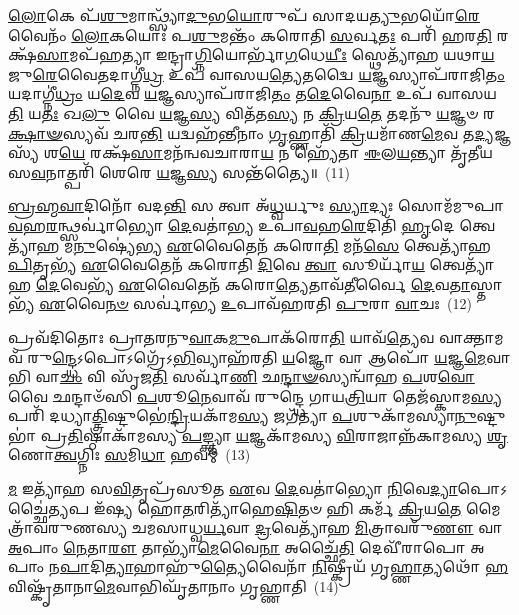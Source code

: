 \-\ul{𑌲𑍋}\-𑌕𑍇 𑌪᳴\-\ul{𑌶𑍁}\-𑌮𑌾𑌨𑍍𑌥𑍍𑌸𑍍𑌯𑌾᳴\-\ul{𑌦𑍁}\-𑌭\-\ul{𑌯𑍋}\-𑌰𑍁𑌪᳴ 𑌸𑌾𑌦𑌯\-\ul{𑌤𑍍𑌯𑍁}\-𑌭𑌯𑍋᳴\-\ul{𑌰𑍇}\-𑌵𑍈𑌨𑌂᳴ \ul{𑌲𑍋}\-𑌕𑌯𑍋𑌃॑ 𑌪\-\ul{𑌶𑍁}\-𑌮𑌨𑍍𑌤𑌂᳴ 𑌕𑌰𑍋𑌤𑌿 \ul{𑌸}\-𑌰𑍍𑌵\-\ul{𑌤𑌃} 𑌪𑌰𑌿᳴ 𑌹𑌰\-\ul{𑌤𑌿} 𑌰𑌕𑍍𑌷᳴\-\ul{𑌸𑌾}\-𑌮𑌪᳴𑌹𑌤𑍍𑌯𑌾 𑌇𑌨𑍍𑌦𑍍𑌰𑌾\-\ul{𑌗𑍍𑌨𑌿}\-𑌯𑍋𑌰𑍍𑌭𑌾᳴\-\ul{𑌗}\-𑌧𑍇\-\ul{𑌯𑍀𑌃} 𑌸𑍍𑌥𑍇𑌤𑍍𑌯𑌾᳴𑌹 𑌯𑌥𑌾\-\ul{𑌯}\-𑌜𑍁\-\ul{𑌰𑍇}\-𑌵𑍈𑌤𑌦𑌾𑌗𑍍𑌨𑍀॑\-\ul{𑌧𑍍𑌰} 𑌉𑌪᳴ 𑌵𑌾𑌸𑌯\-\ul{𑌤𑍍𑌯𑍇}\-𑌤𑌦𑍍𑌵𑍈 \ul{𑌯}\-𑌜𑍍𑌞𑌸𑍍𑌯𑌾𑌪᳴𑌰𑌾𑌜𑌿\-\ul{𑌤𑌂} 𑌯𑌦𑌾𑌗𑍍𑌨𑍀॑\-\ul{𑌧𑍍𑌰𑌂} 𑌯\-\ul{𑌦𑍇}\-𑌵 \ul{𑌯}\-𑌜𑍍𑌞𑌸𑍍𑌯𑌾𑌪᳴𑌰𑌾𑌜𑌿\-\ul{𑌤𑌂} 𑌤\-\ul{𑌦𑍇}\-𑌵𑍈\-\ul{𑌨𑌾} 𑌉𑌪᳴ 𑌵𑌾𑌸𑌯\-\ul{𑌤𑌿} 𑌯\-\ul{𑌤𑌃} 𑌖\-\ul{𑌲𑍁} 𑌵𑍈 \ul{𑌯}\-𑌜𑍍𑌞\-\ul{𑌸𑍍𑌯} 𑌵𑌿𑌤᳴𑌤\-\ul{𑌸𑍍𑌯} 𑌨 \ul{𑌕𑍍𑌰𑌿}\-𑌯\-\ul{𑌤𑍇} 𑌤𑌦𑌨𑍁᳴ \ul{𑌯}\-𑌜𑍍𑌞𑍞 𑌰\-\ul{𑌕𑍍𑌷𑌾}\-\-\ul{𑍟}\-𑌸𑍍𑌯𑌵᳴ 𑌚𑌰\-\ul{𑌨𑍍𑌤𑌿} 𑌯𑌦𑍍𑌵𑌹᳴𑌨𑍍𑌤𑍀𑌨𑌾𑌂 \ul{𑌗𑍃}\-𑌹𑍍𑌣𑌾𑌤𑌿᳴ \ul{𑌕𑍍𑌰𑌿}\-𑌯𑌮𑌾᳴𑌣\-\ul{𑌮𑍇}\-𑌵 𑌤\-\ul{𑌦𑍍𑌯}\-𑌜𑍍𑌞𑌸𑍍𑌯᳴ 𑌶\-\ul{𑌯𑍇} 𑌰𑌕𑍍𑌷᳴\-\ul{𑌸𑌾}\-𑌮𑌨᳴𑌨𑍍𑌵𑌵𑌚𑌾𑌰𑌾\-\ul{𑌯} 𑌨 𑌹𑍍𑌯𑍇᳴𑌤𑌾 \ul{𑌈}\-𑌲\-\ul{𑌯}\-𑌨𑍍𑌤𑍍𑌯𑌾 𑌤𑍃᳴𑌤𑍀𑌯𑌸\-\ul{𑌵}\-𑌨𑌾𑌤𑍍𑌪𑌰𑌿᳴ 𑌶𑍇𑌰𑍇 \ul{𑌯}\-𑌜𑍍𑌞\-\ul{𑌸𑍍𑌯} 𑌸𑌨𑍍𑌤᳴𑌤𑍍𑌯𑍈॥~(11)

{\anuvakamend[{\-\ul{𑌸𑍍𑌯𑌾}\-𑌦𑌿𑌨𑍍𑌦𑍍𑌰𑍋᳴ 𑌗𑍃\-\ul{𑌹𑍍𑌣𑍀}\-𑌯𑌾𑌦᳴\-\ul{𑌸𑍍𑌤𑍍𑌵}\-𑌮𑍁𑌷𑍍𑌮𑌿᳴\-\ul{𑌨𑍍𑌕𑍍𑌰𑌿}\-𑌯\-\ul{𑌤𑍇} 𑌷𑌡𑍍𑌵𑌿𑍞᳴𑌶𑌤𑌿𑌶𑍍𑌚}]}%

\-\ul{𑌬𑍍𑌰}\-\-\ul{𑌹𑍍𑌮}\-\-\ul{𑌵𑌾}\-𑌦𑌿𑌨𑍋᳴ 𑌵𑌦\-\ul{𑌨𑍍𑌤𑌿} 𑌸 𑌤𑍍𑌵𑌾 𑌅᳴\-\ul{𑌧𑍍𑌵}\-𑌰𑍍𑌯𑍁𑌃 \ul{𑌸𑍍𑌯𑌾}\-𑌦𑍍𑌯𑌃 𑌸𑍋𑌮᳴𑌮𑍁𑌪𑌾\-\ul{𑌵}\-𑌹\-\ul{𑌰}\-𑌨𑍍𑌥𑍍𑌸𑌰𑍍𑌵𑌾॑𑌭𑍍𑌯𑍋 \ul{𑌦𑍇}\-𑌵𑌤𑌾॑𑌭𑍍𑌯 𑌉𑌪𑌾\-\ul{𑌵}\-𑌹\-\ul{𑌰𑍇}\-𑌦𑌿𑌤𑌿᳴ \ul{𑌹𑍃}\-𑌦𑍇 𑌤𑍍𑌵𑍇𑌤𑍍𑌯𑌾᳴𑌹 𑌮\-\ul{𑌨𑍁}\-𑌷𑍍𑌯𑍇॑𑌭𑍍𑌯 \ul{𑌏}\-𑌵𑍈𑌤𑍇𑌨᳴ 𑌕𑌰𑍋\-\ul{𑌤𑌿} 𑌮𑌨᳴\-\ul{𑌸𑍇} 𑌤𑍍𑌵𑍇𑌤𑍍𑌯𑌾᳴𑌹 \ul{𑌪𑌿}\-𑌤𑍃𑌭𑍍𑌯᳴ \ul{𑌏}\-𑌵𑍈𑌤𑍇𑌨᳴ 𑌕𑌰𑍋𑌤𑌿 \ul{𑌦𑌿}\-𑌵𑍇 \ul{𑌤𑍍𑌵𑌾} 𑌸𑍂𑌰𑍍𑌯𑌾᳴\-\ul{𑌯} 𑌤𑍍𑌵𑍇𑌤𑍍𑌯𑌾᳴𑌹 \ul{𑌦𑍇}\-𑌵𑍇𑌭𑍍𑌯᳴ \ul{𑌏}\-𑌵𑍈𑌤𑍇𑌨᳴ 𑌕𑌰𑍋\-\ul{𑌤𑍍𑌯𑍇}\-𑌤𑌾𑌵᳴\-\ul{𑌤𑍀}\-𑌰𑍍𑌵𑍈 \ul{𑌦𑍇}\-𑌵\-\ul{𑌤𑌾}\-𑌸𑍍𑌤𑌾𑌭𑍍𑌯᳴ \ul{𑌏}\-𑌵𑍈\-\ul{𑌨}\-\-\ul{𑍞} 𑌸𑌰𑍍𑌵𑌾॑𑌭𑍍𑌯 \ul{𑌉}\-𑌪𑌾𑌵᳴𑌹𑌰𑌤𑌿 \ul{𑌪𑍁}\-𑌰𑌾 \ul{𑌵𑌾}\-𑌚𑌃~(12)

𑌪𑍍𑌰𑌵᳴𑌦𑌿𑌤𑍋𑌃 𑌪𑍍𑌰𑌾𑌤𑌰𑌨𑍁\-\ul{𑌵𑌾}\-𑌕\-\ul{𑌮𑍁}\-𑌪𑌾𑌕᳴𑌰𑍋\-\ul{𑌤𑌿} 𑌯𑌾𑌵᳴\-\ul{𑌤𑍍𑌯𑍇}\-𑌵 𑌵𑌾𑌕𑍍𑌤𑌾𑌮𑌵᳴ 𑌰𑍁\-\ul{𑌨𑍍𑌦𑍍𑌧𑍇}\-\-𑌽𑌪𑍋\-𑌽𑌗𑍍𑌰𑍇᳴\-𑌽\-\ul{𑌭𑌿}\-𑌵𑍍𑌯𑌾𑌹᳴𑌰𑌤𑌿 \ul{𑌯}\-𑌜𑍍𑌞𑍋 𑌵𑌾 𑌆𑌪𑍋᳴ \ul{𑌯}\-𑌜𑍍𑌞\-\ul{𑌮𑍇}\-𑌵𑌾𑌭𑌿 𑌵𑌾\-\ul{𑌚𑌂} 𑌵𑌿 𑌸𑍃᳴𑌜\-\ul{𑌤𑌿} 𑌸𑌰𑍍𑌵𑌾᳴\-\ul{𑌣𑌿} 𑌛\-\ul{𑌨𑍍𑌦𑌾}\-\-\ul{𑍟}\-𑌸𑍍𑌯𑌨𑍍𑌵𑌾᳴𑌹 \ul{𑌪}\-𑌶\-\ul{𑌵𑍋} 𑌵𑍈 𑌛𑌨𑍍𑌦𑌾𑍞᳴𑌸𑌿 \ul{𑌪}\-𑌶𑍂\-\ul{𑌨𑍇}\-𑌵𑌾𑌵᳴ 𑌰𑍁𑌨𑍍𑌦𑍍𑌧𑍇 𑌗𑌾𑌯\-\ul{𑌤𑍍𑌰𑌿}\-𑌯𑌾 𑌤𑍇𑌜᳴𑌸𑍍𑌕𑌾𑌮\-\ul{𑌸𑍍𑌯} 𑌪𑌰𑌿᳴ 𑌦𑌧𑍍𑌯𑌾\-\ul{𑌤𑍍𑌤𑍍𑌰𑌿}\-𑌷𑍍𑌟𑍁𑌭𑍇॑\-\ul{𑌨𑍍𑌦𑍍𑌰𑌿}\-𑌯𑌕𑌾᳴𑌮\-\ul{𑌸𑍍𑌯} 𑌜𑌗᳴𑌤𑍍𑌯𑌾 \ul{𑌪}\-𑌶𑍁𑌕𑌾᳴𑌮𑌸𑍍𑌯𑌾\-\ul{𑌨𑍁}\-𑌷𑍍𑌟𑍁𑌭𑌾॑ 𑌪𑍍𑌰\-\ul{𑌤𑌿}\-𑌷𑍍𑌠𑌾𑌕𑌾᳴𑌮𑌸𑍍𑌯 \ul{𑌪}\-𑌙𑍍𑌕𑍍𑌤𑍍𑌯𑌾 \ul{𑌯}\-𑌜𑍍𑌞𑌕𑌾᳴𑌮𑌸𑍍𑌯 \ul{𑌵𑌿}\-𑌰𑌾𑌜𑌾𑌨𑍍𑌨᳴𑌕𑌾𑌮𑌸𑍍𑌯 \ul{𑌶𑍃}\-𑌣𑍋\-\ul{𑌤𑍍𑌵}\-𑌗𑍍𑌨𑌿𑌃 \ul{𑌸}\-𑌮𑌿\-\ul{𑌧𑌾} 𑌹𑌵𑌮𑍍॑~(13)

\-\ul{𑌮} 𑌇𑌤𑍍𑌯𑌾᳴𑌹 𑌸\-\ul{𑌵𑌿}\-𑌤𑍃𑌪𑍍𑌰᳴𑌸𑍂𑌤 \ul{𑌏}\-𑌵 \ul{𑌦𑍇}\-𑌵𑌤𑌾॑𑌭𑍍𑌯𑍋 \ul{𑌨𑌿}\-𑌵𑍇\-\ul{𑌦𑍍𑌯𑌾}\-𑌪𑍋\-𑌽𑌚𑍍𑌛𑍈॑\-\ul{𑌤𑍍𑌯}\-𑌪 𑌇᳴𑌷𑍍𑌯 𑌹𑍋\-\ul{𑌤}\-𑌰𑌿𑌤𑍍𑌯𑌾᳴𑌹𑍇\-\ul{𑌷𑌿}\-𑌤𑍞 𑌹𑌿 𑌕𑌰𑍍𑌮᳴ \ul{𑌕𑍍𑌰𑌿}\-𑌯\-\ul{𑌤𑍇} 𑌮𑍈𑌤𑍍𑌰𑌾᳴𑌵𑌰𑍁𑌣𑌸𑍍𑌯 𑌚𑌮𑌸𑌾𑌧𑍍𑌵\-\ul{𑌰𑍍𑌯}\-𑌵𑌾 \ul{𑌦𑍍𑌰}\-𑌵𑍇𑌤𑍍𑌯𑌾᳴𑌹 \ul{𑌮𑌿}\-𑌤𑍍𑌰𑌾𑌵𑌰𑍁᳴\-\ul{𑌣𑍗} 𑌵𑌾 \ul{𑌅}\-𑌪𑌾𑌂 \ul{𑌨𑍇}\-𑌤𑌾\-\ul{𑌰𑍗} 𑌤𑌾𑌭𑍍𑌯𑌾᳴\-\ul{𑌮𑍇}\-𑌵𑍈\-\ul{𑌨𑌾} 𑌅𑌚𑍍𑌛𑍈᳴\-\ul{𑌤𑌿} 𑌦𑍇𑌵𑍀᳴𑌰𑌾𑌪𑍋 𑌅𑌪𑌾𑌂 𑌨\-\ul{𑌪𑌾}\-𑌦𑌿\-\ul{𑌤𑍍𑌯𑌾}\-𑌹𑌾𑌹𑍁᳴\-\ul{𑌤𑍍𑌯𑍈}\-𑌵𑍈𑌨𑌾᳴ \ul{𑌨𑌿}\-𑌷𑍍𑌕𑍍𑌰𑍀𑌯᳴ 𑌗𑍃\-\ul{𑌹𑍍𑌣𑌾}\-𑌤𑍍𑌯𑌥𑍋᳴ \ul{𑌹}\-𑌵𑌿𑌷𑍍𑌕𑍃᳴𑌤𑌾𑌨𑌾\-\ul{𑌮𑍇}\-𑌵𑌾𑌭𑌿𑌘𑍃᳴𑌤𑌾𑌨𑌾𑌂 𑌗𑍃𑌹𑍍𑌣𑌾𑌤𑌿~(14)

